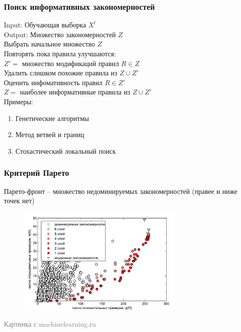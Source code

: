 \documentclass[12pt]{beamer}
\begin{document}



\begin{frame}\frametitle{Поиск информативных закономерностей}
Input: Обучающая выборка $X^l$\\
Output: Множество закономерностей $Z$\\
\vspace{5mm}
Выбрать начальное множество $Z$\\
Повторять пока правила улучшаются:\\
\hspace{10mm} $Z'=$ множество модификаций правил $R \in Z$\\
\hspace{10mm} Удалить слишком похожие правила из $Z \cup Z'$\\
\hspace{10mm} Оценить инфомативность правил $R \in Z'$\\
\hspace{10mm} $Z=$ наиболее информативные правила из $Z \cup Z'$\\
\vspace{5mm}
Примеры:\\
\begin{enumerate}[--]
	\item Генетические алгоритмы
	\item Метод ветвей и границ	
	\item Стохастический локальный поиск	
\end{enumerate}

\end{frame}

\begin{frame}\frametitle{Критерий Парето}
Парето-фронт -- множество недоминируемых закономерностей (правее и ниже точек нет)
\begin{figure}[htbp]
  \includegraphics[height=150pt, keepaspectratio = true]{images/pareto}   
\end{figure}
\footnotesize\textcolor{gray} {Картинка с machinelearning.ru}
\end{frame}
\end{document}
